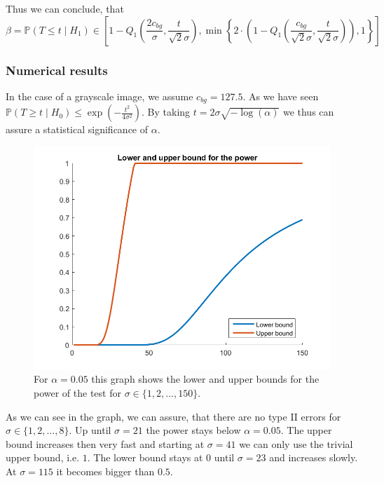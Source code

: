 \documentclass[a4paper,12pt]{article}
\theoremstyle{plain}
\theoremstyle{definition}
\theoremstyle{remark}
\begin{document}
	Thus we can conclude, that
	\begin{equation*}
		\beta = \mathbb{P}(T \leq t \mid H_1) \in \left[ 1 - Q_1 \left( \frac{2 c_{bg}}{\sigma}, \frac{t}{\sqrt{2} \sigma} \right), \min \left\{ 2 \cdot \left( 1 - Q_1 \left( \frac{c_{bg}}{\sqrt{2} \sigma}, \frac{t}{\sqrt{2} \sigma} \right) \right), 1 \right\} \right]
	\end{equation*}
	
	\subsubsection{Numerical results}
	
	In the case of a grayscale image, we assume $c_{bg} = 127.5$. As we have seen $\mathbb{P}(T \geq t \mid H_0) \leq \exp \left( - \frac{t^2}{4 \sigma^2} \right)$. By taking $t = 2 \sigma \sqrt{- \log(\alpha)}$ we thus can assure a statistical significance of $\alpha$.
	
	\begin{figure}[h]
		\includegraphics[width=\linewidth]{Power_Bounds}
		\caption[Power bounds]{For $\alpha = 0.05$ this graph shows the lower and upper bounds for the power of the test for $\sigma \in \{ 1, 2, \dots, 150 \}$.}
		\label{fig:demo1comparison}
	\end{figure}
	
	As we can see in the graph, we can assure, that there are no type II errors for $\sigma \in \{ 1, 2, \dots, 8 \}$. Up until $\sigma = 21$ the power stays below $\alpha = 0.05$. The upper bound increases then very fast and starting at $\sigma = 41$ we can only use the trivial upper bound, i.e. $1$. The lower bound stays at $0$ until $\sigma = 23$ and increases slowly. At $\sigma = 115$ it becomes bigger than $0.5$.
	
\end{document}
